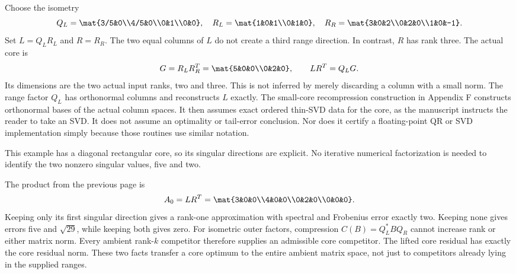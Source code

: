 Choose the isometry
\[
Q_L=\mat{3/5&0\\4/5&0\\0&1\\0&0},\quad
R_L=\mat{1&0&1\\0&1&0},\quad
R_R=\mat{3&0&2\\0&2&0\\1&0&-1}.
\]
Set $L=Q_LR_L$ and $R=R_R$. The two equal columns of $L$ do not create a third range direction. In contrast, $R$ has rank three.
The actual core is
\[
G=R_LR_R^T=\mat{5&0&0\\0&2&0},\qquad LR^T=Q_LG.
\]
Its dimensions are the two actual input ranks, two and three. This is not inferred by merely discarding a column with a small norm. The range factor $Q_L$ has orthonormal columns and reconstructs $L$ exactly.
The small-core recompression construction in Appendix F constructs orthonormal bases of the actual column spaces. It then assumes exact ordered thin-SVD data for the core, as the manuscript instructs the reader to take an SVD. It does not assume an optimality or tail-error conclusion. Nor does it certify a floating-point QR or SVD implementation simply because those routines use similar notation.

This example has a diagonal rectangular core, so its singular directions are explicit. No iterative numerical factorization is needed to identify the two nonzero singular values, five and two.

The product from the previous page is
\[
A_0=LR^T=\mat{3&0&0\\4&0&0\\0&2&0\\0&0&0}.
\]
Keeping only its first singular direction gives a rank-one approximation with spectral and Frobenius error exactly two. Keeping none gives errors five and $\sqrt{29}$, while keeping both gives zero.
For isometric outer factors, compression $C(B)=Q_L^*BQ_R$ cannot increase rank or either matrix norm. Every ambient rank-$k$ competitor therefore supplies an admissible core competitor. The lifted core residual has exactly the core residual norm. These two facts transfer a core optimum to the entire ambient matrix space, not just to competitors already lying in the supplied ranges.

